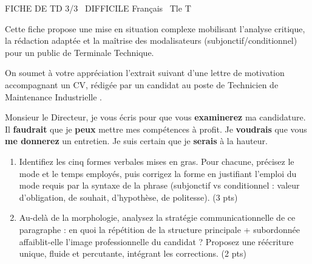 \documentclass[11pt]{article}
\begin{document}
\begin{tcolorbox}[enhanced,colback=popink,colframe=popink,arc=10pt,boxrule=0pt,left=12pt,right=12pt,top=9pt,bottom=9pt]
{\color{white}\popxbold\small FICHE DE TD 3/3 \textbullet\ DIFFICILE \hfill Français \textbullet\ Tle T\par}
\end{tcolorbox}
\vspace{4pt}
Cette fiche propose une mise en situation complexe mobilisant l'analyse critique, la rédaction adaptée et la maîtrise des modalisateurs (subjonctif/conditionnel) pour un public de Terminale Technique.

\begin{exercice}
On soumet à votre appréciation l'extrait suivant d'une lettre de motivation accompagnant un CV, rédigée par un candidat au poste de \og Technicien de Maintenance Industrielle \fg{}.

\og Monsieur le Directeur, je vous écris pour que vous \textbf{examinerez} ma candidature. Il \textbf{faudrait} que je \textbf{peux} mettre mes compétences à profit. Je \textbf{voudrais} que vous \textbf{me donnerez} un entretien. Je suis certain que je \textbf{serais} à la hauteur. \fg{}

\begin{enumerate}
    \item Identifiez les cinq formes verbales mises en gras. Pour chacune, précisez le mode et le temps employés, puis corrigez la forme en justifiant l'emploi du mode requis par la syntaxe de la phrase (subjonctif vs conditionnel : valeur d'obligation, de souhait, d'hypothèse, de politesse). (3 pts)
    \item Au-delà de la morphologie, analysez la stratégie communicationnelle de ce paragraphe : en quoi la répétition de la structure principale + subordonnée affaiblit-elle l'image professionnelle du candidat ? Proposez une réécriture unique, fluide et percutante, intégrant les corrections. (2 pts)
\end{enumerate}
\end{exercice}
\end{document}
